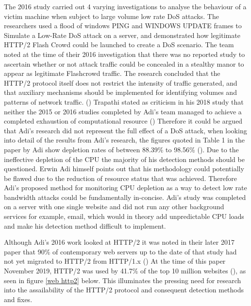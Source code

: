 The 2016 study carried out 4 varying investigations to analyse the behaviour of a victim machine when subject to large volume low rate DoS attacks. The researchers used a flood of windows PING and WINDOWS UPDATE frames to Simulate a Low-Rate DoS attack on a server, and demonstrated how legitimate HTTP/2 Flash Crowd could be launched to create a DoS scenario.  The team noted at the time of their 2016 investigation that there was no reported study to ascertain whether or not attack traffic could be concealed in a stealthy manor to appear as legitimate Flashcrowd traffic. The research concluded that the HTTP/2 protocol itself does not restrict the intensity of traffic generated, and that auxiliary mechanisms should be implemented for identifying volumes and patterns of network traffic. (\cite{Adi2016}) Trapathi stated as criticism in his 2018 study that neither the 2015 or 2016 studies completed by Adi's team managed to achieve a completed exhaustion of computational resource (\cite{tripathi2018slow}) Therefore it could be argued that Adi's research did not represent the full effect of a DoS attack, when looking into detail of the results from Adi's research, the figures quoted in Table 1 in the paper by Adi show depletion rates of between 88.39\% to 98.56\% (\cite{Adi2016}). Due to the ineffective depletion of the CPU the majority of his detection methods should be questioned. Erwin Adi himself points out that his methodology could potentially be flawed due to the reduction of resource status that was achieved. Therefore Adi's proposed method for monitoring CPU depletion as a way to detect low rate bandwidth attacks could be fundamentally in-concise. Adi's study was completed on a server with one single website and did not run any other background services for example, email, which would in theory add unpredictable CPU loads and make his detection method difficult to implement.

Although Adi's 2016 work looked at HTTP/2 it was noted in their later 2017 paper that 90\% of contemporary web servers up to the date of that study had not yet migrated to HTTP/2 from HTTP/1.x (\cite{adi2017stealthy}) At the time of this paper November 2019, HTTP/2 was used by 41.7\% of the top 10 million websites (\cite{w3techs}), as seen in figure \ref{web http2} below. This illuminates the pressing need for research into the assailability of the HTTP/2 protocol and consequent detection methods and fixes. 
 
